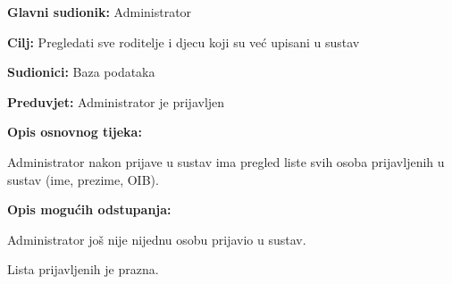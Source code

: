 						\noindent {}
					\begin{packed_item}
						
						\item \textbf{Glavni sudionik: }Administrator
						\item  \textbf{Cilj:} Pregledati sve roditelje i djecu koji su već upisani u sustav
						\item  \textbf{Sudionici:} Baza podataka
						\item  \textbf{Preduvjet:} Administrator je prijavljen
						\item  \textbf{Opis osnovnog tijeka:}
						
						\item[] \begin{packed_enum}
							
							\item Administrator nakon prijave u sustav ima pregled liste svih osoba prijavljenih u sustav (ime, prezime, OIB).
						\end{packed_enum}
						
						\item  \textbf{Opis mogućih odstupanja:}
						
						\item[] \begin{packed_item}
							
							\item[4.a] Administrator još nije nijednu osobu prijavio u sustav.
							\item[] \begin{packed_enum}
								
								\item Lista prijavljenih je prazna.
							\end{packed_enum}
							
							
						\end{packed_item}
						
						
					\end{packed_item}
					
